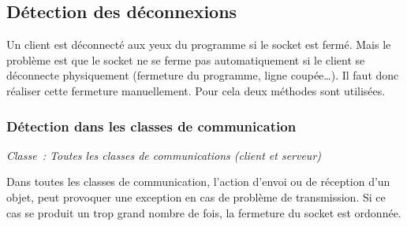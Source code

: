 \documentclass[a4paper,11pt]{report}
\begin{document}
  \subsection{Détection des déconnexions}
    Un client est déconnecté aux yeux du programme si le socket est fermé. Mais le problème est que le socket ne se ferme pas automatiquement si le client se déconnecte physiquement (fermeture du programme, ligne coupée…). Il faut donc réaliser cette fermeture manuellement. Pour cela deux méthodes sont utilisées.
    
  \subsubsection{Détection dans les classes de communication}
    \begin{center}
    \textit{Classe : Toutes les classes de communications (client et serveur)}
    \end{center}
      Dans toutes les classes de communication, l’action d’envoi ou de réception d’un objet, peut provoquer une exception en cas de problème de transmission. Si ce cas se produit un trop grand nombre de fois, la fermeture du socket est ordonnée.
    
\end{document}
